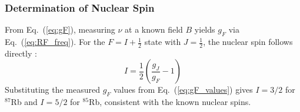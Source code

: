 \subsubsection*{Determination of Nuclear Spin}
 
From Eq.~(\ref{eq:gF}), measuring $\nu$ at a known field $B$ yields $g_F$ via
Eq.~(\ref{eq:RF_freq}). For the $F = I + \tfrac{1}{2}$ state with $J = \tfrac{1}{2}$,
the nuclear spin follows directly :
\begin{equation}
    I = \frac{1}{2}\!\left(\frac{g_J}{g_F} - 1\right)
    \label{eq:I_from_gF}
\end{equation}
Substituting the measured $g_F$ values from Eq.~(\ref{eq:gF_values}) gives
$I = 3/2$ for $^{87}$Rb and $I = 5/2$ for $^{85}$Rb, consistent with the
known nuclear spins.